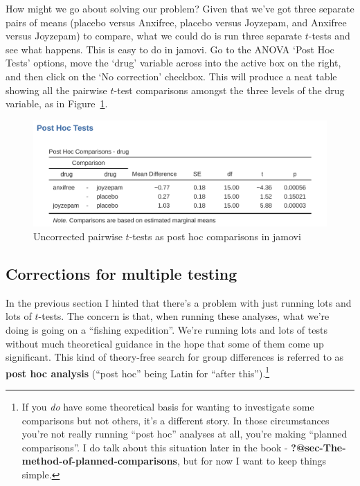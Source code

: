 \documentclass[
  a4paper,
]{book}
\begin{document}
How might we go about solving our problem? Given that we've got three
separate pairs of means (placebo versus Anxifree, placebo versus
Joyzepam, and Anxifree versus Joyzepam) to compare, what we could do is
run three separate \(t\)-tests and see what happens. This is easy to do
in jamovi. Go to the ANOVA `Post Hoc Tests' options, move the `drug'
variable across into the active box on the right, and then click on the
`No correction' checkbox. This will produce a neat table showing all the
pairwise \(t\)-test comparisons amongst the three levels of the drug
variable, as in Figure~\ref{fig-fig13-4}.

\begin{figure}

\includegraphics[width=1\textwidth,height=\textheight]{images/fig13-4.png} \hfill{}

\caption{\label{fig-fig13-4}Uncorrected pairwise \(t\)-tests as post hoc
comparisons in jamovi}

\end{figure}

\hypertarget{corrections-for-multiple-testing}{%
\subsection{Corrections for multiple
testing}\label{corrections-for-multiple-testing}}

In the previous section I hinted that there's a problem with just
running lots and lots of \(t\)-tests. The concern is that, when running
these analyses, what we're doing is going on a ``fishing expedition''.
We're running lots and lots of tests without much theoretical guidance
in the hope that some of them come up significant. This kind of
theory-free search for group differences is referred to as \textbf{post
hoc analysis} (``post hoc'' being Latin for ``after this'').\footnote{If
  you \emph{do} have some theoretical basis for wanting to investigate
  some comparisons but not others, it's a different story. In those
  circumstances you're not really running ``post hoc'' analyses at all,
  you're making ``planned comparisons''. I do talk about this situation
  later in the book - \textbf{?@sec-The-method-of-planned-comparisons},
  but for now I want to keep things simple.}
\end{document}
